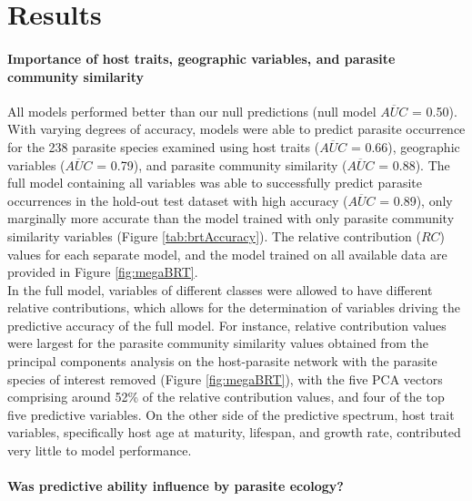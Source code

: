 \documentclass[12pt]{article}
\begin{document}
   
\section*{Results}

  \paragraph{Importance of host traits, geographic variables, and parasite community similarity}
  All models performed better than our null predictions (null model $\overline{AUC}$ = 0.50). With varying degrees of accuracy, models were able to predict parasite occurrence for the 238 parasite species examined using host traits ($\overline{AUC}$ = 0.66), geographic variables ($\overline{AUC}$ = 0.79), and parasite community similarity ($\overline{AUC}$ = 0.88). The full model containing all variables was able to successfully predict parasite occurrences in the hold-out test dataset with high accuracy ($\overline{AUC}$ = 0.89), only marginally more accurate than the model trained with only parasite community similarity variables (Figure \ref{tab:brtAccuracy}). The relative contribution ($RC$) values for each separate model, and the model trained on all available data are provided in Figure \ref{fig:megaBRT}.  \\
  
  In the full model, variables of different classes were allowed to have different relative contributions, which allows for the determination of variables driving the predictive accuracy of the full model. For instance, relative contribution values were largest for the parasite community similarity values obtained from the principal components analysis on the host-parasite network with the parasite species of interest removed (Figure \ref{fig:megaBRT}), with the five PCA vectors comprising around 52\% of the relative contribution values, and four of the top five predictive variables. On the other side of the predictive spectrum, host trait variables, specifically host age at maturity, lifespan, and growth rate, contributed very little to model performance. \\
    
  
  \paragraph{Was predictive ability influence by parasite ecology?} 
  
\end{document}
